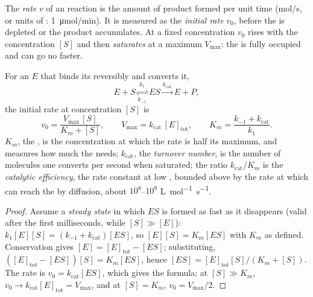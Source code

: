 \begin{definition}\label{def:b1:enzymes:rate}
The \emph{rate} $v$ of an  reaction is the
amount of product formed per unit time (\unit{mol/s}, or units of
: \qty{1}{\micro mol/min}). It is measured as the \emph{initial
rate} $v_0$, before the  is depleted or the product
accumulates. At a fixed  concentration $v_0$ rises with the
 concentration $[S]$ and then \emph{saturates} at a maximum
$V_{\max}$: the  is fully occupied and can go no faster.
\end{definition}

\begin{theorem}\label{thm:b1:enzymes:mm}
For an  $E$ that binds its  reversibly and converts it,
\[
E + S \underset{k_{-1}}{\overset{k_1}{\rightleftharpoons}} ES
\overset{k_{\text{cat}}}{\longrightarrow} E + P ,
\]
the initial rate at  concentration $[S]$ is
\[
v_0 = \frac{V_{\max}\,[S]}{K_m + [S]}, \qquad V_{\max} = k_{\text{cat}}\,[E]_{\text{tot}},
\qquad K_m = \frac{k_{-1} + k_{\text{cat}}}{k_1} .
\]
$K_m$, the \emph{}, is the  concentration
at which the rate is half its maximum, and measures how much 
the  needs; $k_{\text{cat}}$, the \emph{turnover
number}, is the number of  molecules
one  converts per second when saturated; the ratio
$k_{\text{cat}}/K_m$ is the \emph{catalytic efficiency}, the rate
constant at low , bounded above by the rate at which
 can reach the  by diffusion, about
$10^8$--$10^9$ \unit{L.mol^{-1}.s^{-1}}.
\end{theorem}
\begin{proof}
Assume a \emph{steady state} in which $ES$ is formed as fast as it
disappears (valid after the first milliseconds, while $[S] \gg [E]$):
$k_1[E][S] = (k_{-1} + k_{\text{cat}})[ES]$, so $[E][S] = K_m[ES]$
with $K_m$ as defined. Conservation gives $[E] = [E]_{\text{tot}} -
[ES]$; substituting, $([E]_{\text{tot}} - [ES])[S] = K_m[ES]$, hence
$[ES] = [E]_{\text{tot}}[S]/(K_m + [S])$. The rate is
$v_0 = k_{\text{cat}}[ES]$, which gives the formula; at $[S] \gg K_m$,
$v_0 \to k_{\text{cat}}[E]_{\text{tot}} = V_{\max}$, and at $[S] = K_m$,
$v_0 = V_{\max}/2$.
\end{proof}

